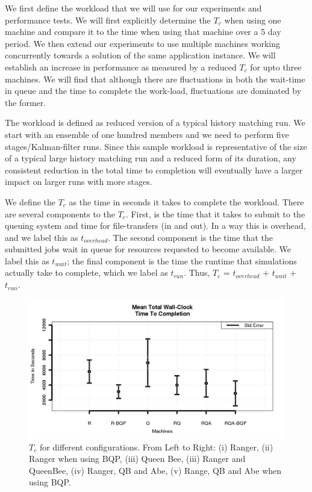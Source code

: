 \documentclass[conference,final]{IEEEtran}
\newcommand{\tc}{$T_c$ }
\newcommand{\tcnsp}{$T_c$}
\begin{document}
We first define the workload that we will use for our experiments and
performance tests. We will first explicitly determine the \tc when
using one machine and compare it to the time when using that machine
over a 5 day period. We then extend our experiments to use multiple
machines working concurrently towards a solution of the same
application instance.  We will establish an increase in performance as
measured by a reduced \tc for upto three machines.  We will find that
although there are fluctuations in both the wait-time in queue and the
time to complete the work-load, fluctuations are dominated by the
former.

The workload is defined as reduced version of a typical history
matching run. We start with an ensemble of one hundred members and we
need to perform five stages/Kalman-filter runs. Since this sample
workload is representative of the size of a typical large history
matching run and a reduced form of its duration, any consistent
reduction in the total time to completion will eventually have a
larger impact on larger runs with more stages.

We define the \tc as the time in seconds it takes to complete the
workload. There are several components to the \tcnsp. First, is the
time that it takes to submit to the queuing system and time for
file-transfers (in and out). In a way this is overhead, and we label
this as $t_{overhead}$.  The second component is the time that the
submitted jobs wait in queue for resources requested to become
available. We label this as $t_{wait}$; the final component is the
time the runtime that simulations actually take to complete, which we
label as $t_{run}$. Thus, \tc = $t_{overhead}$ + $t_{wait}$ +
$t_{run}$.

\begin{figure}
\begin{center}
\includegraphics[scale=0.40]{./figures/Figure7.png}
\end{center}
\caption{\tc for different configurations.  From Left to Right: (i)
  Ranger, (ii) Ranger when using BQP, (iii) Queen Bee, (iii) Ranger
  and QueenBee, (iv) Ranger, QB and Abe, (v) Range, QB and Abe when
  using BQP.}
\label{fig:results}
\end{figure}
\end{document}
